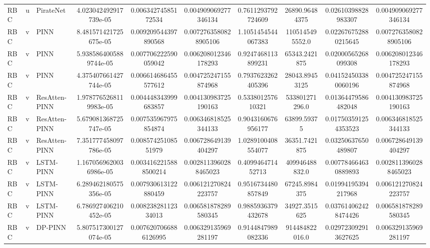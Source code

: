 \begin{landscape}
\begin{longtable}{lllccccccc}
 RBC &     u &      PirateNet &  4.023042492917739e-05 &    0.00634274585172534 &   0.004909069277346134 &   0.7611293792724609 &        26890.96484375 &   0.02610398828983307 &   0.004909069277346134 \\
 RBC &     v &           PINN &  8.481571421725675e-05 &   0.009209544397890568 &  0.0072763580828905106 &   1.1051454544067383 &       1105145495552.0 &  0.022676752880215645 &  0.0072763580828905106 \\
 RBC &     v &           PINN & 5.9385864005889744e-05 &   0.007706222590059042 &   0.006208012346178293 &   0.9247468113899231 &         65343.2421875 &   0.02000565268099308 &   0.006208012346178293 \\
 RBC &     v &           PINN &  4.375407661427744e-05 &   0.006614686455577612 &   0.004725247155874968 &   0.7937623262405396 &        28043.89453125 &  0.041524503380060196 &   0.004725247155874968 \\
 RBC &     v &  ResAtten-PINN & 1.9787765268119983e-05 &   0.004448343999683857 &   0.004130983725190163 &    0.533801257610321 &        533801271296.0 &   0.01364479586482048 &   0.004130983725190163 \\
 RBC &     v &  ResAtten-PINN &  5.679081368725747e-05 &   0.007535967975854874 &   0.006346818525344133 &   0.9043160676956177 &           63899.59375 &  0.017503591254353523 &   0.006346818525344133 \\
 RBC &     v &  ResAtten-PINN &  7.351777458097786e-05 &    0.00857425108551979 &   0.006728649139404297 &   1.0289100408554077 &         36351.7421875 &   0.03250637650489807 &   0.006728649139404297 \\
 RBC &     v &      LSTM-PINN & 1.1670569620036986e-05 &  0.0034162215888500214 &  0.0028113960288465023 &    0.409946471452713 &        409946488832.0 &  0.007784664630889893 &  0.0028113960288465023 \\
 RBC &     v &      LSTM-PINN &  6.289462180575356e-05 &   0.007930613122880459 &   0.006121270824223757 &   0.9516734480857849 &         67245.8984375 &   0.01994195394217968 &   0.006121270824223757 \\
 RBC &     v &      LSTM-PINN &  6.786927406210452e-05 &    0.00823828112334013 &   0.006581878289580345 &   0.9885936379432678 &         34927.3515625 &  0.037614062428474426 &   0.006581878289580345 \\
 RBC &     v &        DP-PINN &  5.807517300127074e-05 &  0.0076207066886126995 &   0.006329135969281197 &   0.9144847989082336 &        914484822016.0 &  0.029723092913627625 &   0.006329135969281197 \\

\end{longtable}
\end{landscape}
